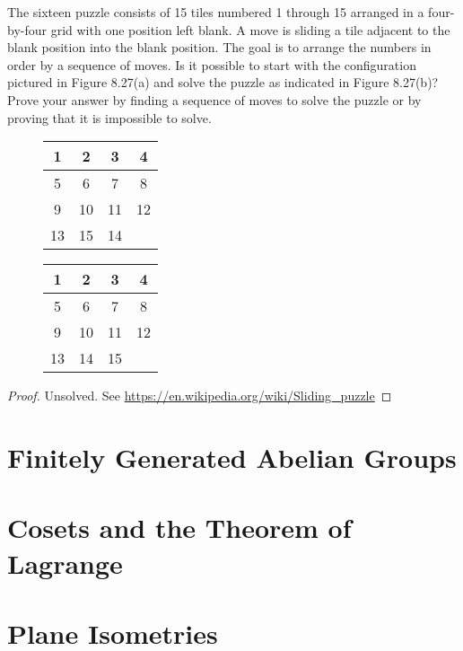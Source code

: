 \begin{exercise}
    The sixteen puzzle consists of 15 tiles numbered 1 through 15 arranged in a four-by-four grid with one position left blank. A move is sliding a tile adjacent to the blank position into the blank position. The goal is to arrange the numbers in order by a sequence of moves. Is it possible to start with the configuration pictured in Figure 8.27(a) and solve the puzzle as indicated in Figure 8.27(b)? Prove your answer by finding a sequence of moves to solve the puzzle or by proving that it is impossible to solve.
    \begin{figure}[htp]
        \centering
        \begin{tabular}{|c|c|c|c|}
            \hline
            1  & 2  & 3  & 4  \\
            \hline
            5  & 6  & 7  & 8  \\
            \hline
            9  & 10 & 11 & 12 \\
            \hline
            13 & 15 & 14 &    \\
            \hline
        \end{tabular}
        \hspace{2cm}
        \begin{tabular}{|c|c|c|c|}
            \hline
            1  & 2  & 3  & 4  \\
            \hline
            5  & 6  & 7  & 8  \\
            \hline
            9  & 10 & 11 & 12 \\
            \hline
            13 & 14 & 15 &    \\
            \hline
        \end{tabular}
    \end{figure}
\end{exercise}

\begin{proof}
    Unsolved. See \url{https://en.wikipedia.org/wiki/Sliding_puzzle}
\end{proof}

\section{Finitely Generated Abelian Groups}



\section{Cosets and the Theorem of Lagrange}



\section{Plane Isometries}
